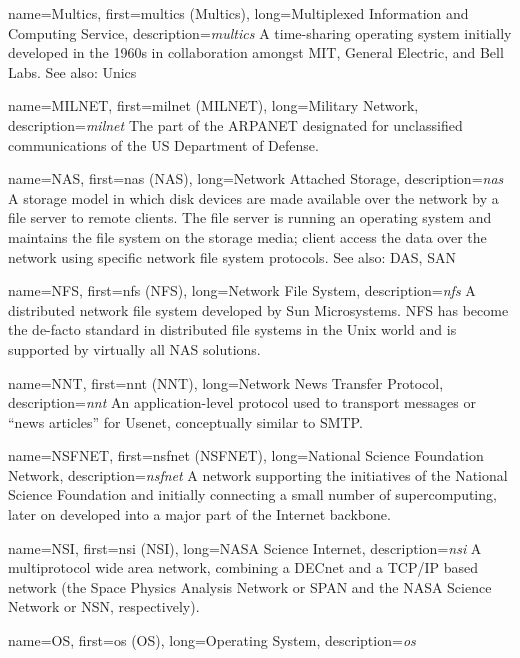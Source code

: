 {
	name={Multics},
	first={\acrlong{multics} (Multics)},
	long={Multiplexed Information and Computing Service},
	description={{\em \acrlong{multics}} A time-sharing operating system
initially developed in the 1960s in collaboration amongst MIT, General Electric,
and Bell Labs. See also: Unics}
}

{
	name={MILNET},
	first={\acrlong{milnet} (MILNET)},
	long={Military Network},
	description={{\em \acrlong{milnet}} The part of the ARPANET designated
for unclassified communications of the US Department
of Defense.}
}

{
	name={NAS},
	first={\acrlong{nas} (NAS)},
	long={Network Attached Storage},
	description={{\em \acrlong{nas}} A storage model in which disk
devices are made available over the network by a file server to remote
clients.  The file server is running an operating system and maintains the
file system on the storage media; client access the data over the network
using specific network file system protocols.  See
also: DAS, SAN}
}

{
	name={NFS},
	first={\acrlong{nfs} (NFS)},
	long={Network File System},
	description={{\em \acrlong{nfs}} A distributed network file system
developed by Sun Microsystems.  NFS has become the de-facto standard in
distributed file systems in the Unix world and is supported by virtually
all NAS solutions.}
}

{
	name={NNT},
	first={\acrlong{nnt} (NNT)},
	long={Network News Transfer Protocol},
	description={{\em \acrlong{nnt}} An application-level
protocol used to transport messages or ``news articles'' for Usenet,
conceptually similar to SMTP.}
}

{
	name={NSFNET},
	first={\acrlong{nsfnet} (NSFNET)},
	long={National Science Foundation Network},
	description={{\em \acrlong{nsfnet}} A network
supporting the initiatives of the National Science Foundation and
initially connecting a small number of supercomputing, later on developed
into a major part of the Internet backbone.}
}

{
	name={NSI},
	first={\acrlong{nsi} (NSI)},
	long={NASA Science Internet},
	description={{\em \acrlong{nsi}} A multiprotocol wide area network,
combining a DECnet and a TCP/IP based network (the Space Physics Analysis
Network or SPAN and the NASA Science Network or NSN,
respectively).}
}

{
	name={OS},
	first={\acrlong{os} (OS)},
	long={Operating System},
	description={{\em \acrlong{os}} \empty}
}

